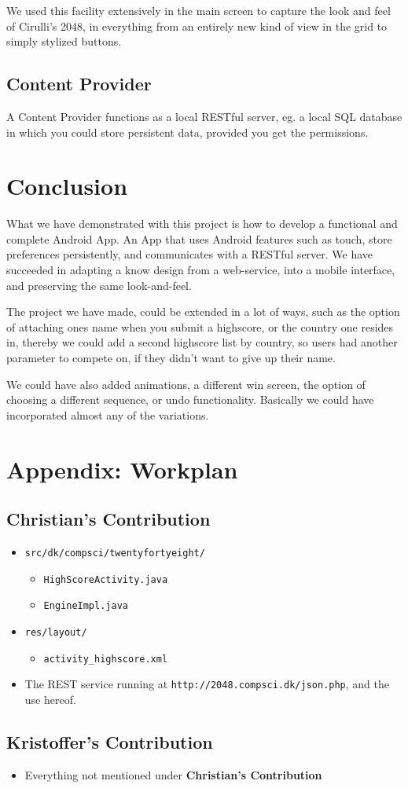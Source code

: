 \documentclass[a4paper, 12pt]{article}
\newcommand{\code}[1]{\texttt{#1}}
\begin{document}
We used this facility extensively in the main screen to capture the
look and feel of Cirulli's 2048, in everything from an entirely new
kind of view in the grid to simply stylized buttons.



\subsection{Content Provider}
A Content Provider functions as a local RESTful server, eg. a local SQL database in which you could store persistent data, provided you get the permissions.

\section{Conclusion}
What we have demonstrated with this project is how to develop a functional and complete Android App. An App that uses Android features such as touch, store preferences persistently, and communicates with a RESTful server. We have succeeded in adapting a know design from a web-service, into a mobile interface, and preserving the same look-and-feel.

The project we have made, could be extended in a lot of ways, such as the option of attaching ones name when you submit a highscore, or the country one resides in, thereby we could add a second highscore list by country, so users had another parameter to compete on, if they didn't want to give up their name.

We could have also added animations, a different win screen, the option of choosing a different sequence, or undo functionality. Basically we could have incorporated almost any of the variations.

\newpage
\appendix
\section{Appendix: Workplan}
\subsection{Christian's Contribution}
\begin{itemize}
\item \code{src/dk/compsci/twentyfortyeight/}
  \begin{itemize}
  \item \code{HighScoreActivity.java}
  \item \code{EngineImpl.java}
  \end{itemize}
\item \code{res/layout/}
  \begin{itemize}
  \item \code{activity\_highscore.xml}
  \end{itemize}
\item The REST service running at \code{http://2048.compsci.dk/json.php}, and the use hereof.
\end{itemize}
\subsection{Kristoffer's Contribution}
\begin{itemize}
\item Everything not mentioned under \textbf{Christian's Contribution}
\end{itemize}
\end{document}
